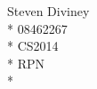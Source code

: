 \documentclass[a4paper,12pt]{article}
\begin{document}
\begin{center}
{\large Steven Diviney} \\*
08462267 \\*
CS2014 \\*
RPN \\*

\end{center}
\end{document}
